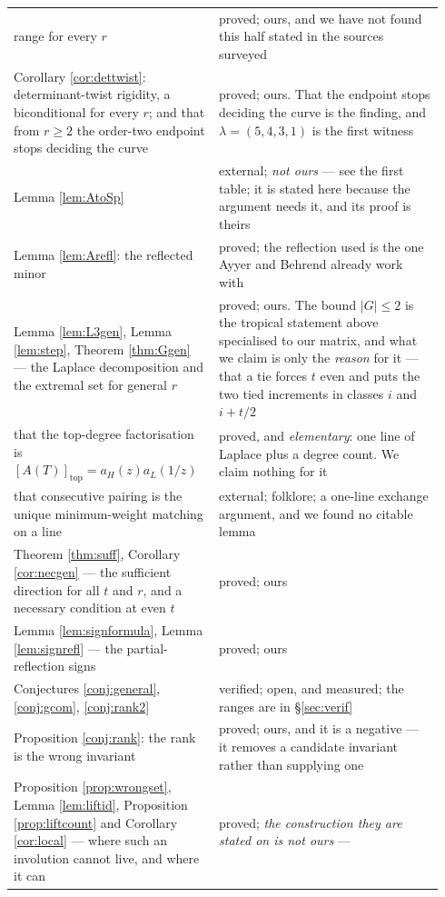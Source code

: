 \documentclass[11pt,reqno]{amsart}
\newcommand{\stproved}{\textcolor{hproved}{\small proved}}
\newcommand{\stverif}{\textcolor{hverif}{\small verified}}
\newcommand{\stext}{\textcolor{hext}{\small external}}
\theoremstyle{plain}
\theoremstyle{definition}
\begin{document}
\begin{longtable}{@{}>{\raggedright\arraybackslash}p{0.44\linewidth}%
                   >{\raggedright\arraybackslash}p{0.50\linewidth}@{}}
range for every $r$ & \stproved; ours, and we have not found this half stated in the sources surveyed\\
Corollary \ref{cor:dettwist}: determinant-twist rigidity, a biconditional for every $r$; and
that from $r\ge2$ the order-two endpoint stops deciding the curve &
\stproved; ours. That the endpoint stops deciding the curve is the finding, and
$\lambda=(5,4,3,1)$ is the first witness\\
Lemma \ref{lem:AtoSp} & \stext; \emph{not ours} --- see the first table; it is stated here because the
argument needs it, and its proof is theirs\\
Lemma \ref{lem:Arefl}: the reflected minor & \stproved; the reflection used is the one Ayyer and
Behrend already work with\\
Lemma \ref{lem:L3gen}, Lemma \ref{lem:step}, Theorem \ref{thm:Ggen} --- the Laplace decomposition and
the extremal set for general $r$ & \stproved; ours. The bound $|G|\le2$ is the tropical statement
above specialised to our matrix, and what we claim is only the \emph{reason} for it --- that a tie
forces $t$ even and puts the two tied increments in classes $i$ and $i+t/2$\\
that the top-degree factorisation is $[A(T)]_{\mathrm{top}}=a_H(z)a_L(1/z)$ & \stproved, and
\emph{elementary}: one line of Laplace plus a degree count. We claim nothing for it\\
that consecutive pairing is the unique minimum-weight matching on a line & \stext; folklore; a one-line
exchange argument, and we found no citable lemma\\
Theorem \ref{thm:suff}, Corollary \ref{cor:necgen} --- the sufficient direction for all $t$ and $r$,
and a necessary condition at even $t$ & \stproved; ours\\
Lemma \ref{lem:signformula}, Lemma \ref{lem:signrefl} --- the partial-reflection signs &
\stproved; ours\\
Conjectures \ref{conj:general}, \ref{conj:gcom}, \ref{conj:rank2} & \stverif; open, and measured; the ranges
are in \S\ref{sec:verif}\\
Proposition \ref{conj:rank}: the rank is the wrong invariant & \stproved; ours, and it is a negative
--- it removes a candidate invariant rather than supplying one\\
Proposition \ref{prop:wrongset}, Lemma \ref{lem:liftid}, Proposition \ref{prop:liftcount}
and Corollary \ref{cor:local} --- where such an involution cannot live, and where it can
& \stproved; \emph{the construction they are stated on is not ours} ---

\end{longtable}
\end{document}
